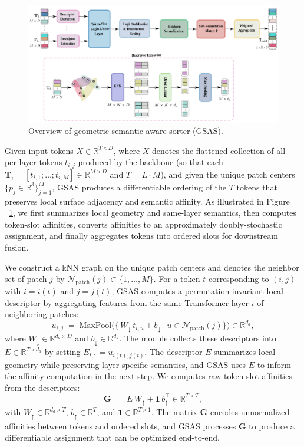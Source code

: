 \begin{figure}[h!]
  \centering 
    \includegraphics[width=0.98\linewidth]{figs/GSAS}
  \caption{Overview of geometric semantic-aware sorter (GSAS).}
  \label{fig:GSAS}
\end{figure}

Given input tokens \(X\in\mathbb{R}^{T\times D}\), where \(X\) denotes the flattened collection of all per-layer tokens \(t_{i,j}\) produced by the backbone (so that each \(\mathbf{T}_i=[t_{i,1};\dots;t_{i,M}]\in\mathbb{R}^{M\times D}\) and \(T=L\cdot M\)), and given the unique patch centers \(\{p_j\in\mathbb{R}^3\}_{j=1}^M\), GSAS produces a differentiable ordering of the \(T\) tokens that preserves local surface adjacency and semantic affinity. As illustrated in Figure ~\ref{fig:GSAS}, we first summarizes local geometry and same-layer semantics, then computes token-slot affinities, converts affinities to an approximately doubly-stochastic assignment, and finally aggregates tokens into ordered slots for downstream fusion.

We construct a kNN graph on the unique patch centers and denotes the neighbor set of patch \(j\) by \(\mathcal{N}_{\mathrm{patch}}(j)\subset\{1,\dots,M\}\). For a token \(t\) corresponding to \((i,j)\) with \(i=i(t)\) and \(j=j(t)\), GSAS computes a permutation-invariant local descriptor by aggregating features from the same Transformer layer \(i\) of neighboring patches:
\begin{equation}
u_{i,j} \;=\; \mathrm{MaxPool}\Big(\big\{\,W_{\downarrow}\,t_{i,u} + b_{\downarrow} \ \big|\ u\in\mathcal{N}_{\mathrm{patch}}(j)\big\}\Big)\in\mathbb{R}^{d_a},
\end{equation}
where \(W_{\downarrow}\in\mathbb{R}^{d_a\times D}\) and \(b_{\downarrow}\in\mathbb{R}^{d_a}\). The module collects these descriptors into \(E\in\mathbb{R}^{T\times d_a}\) by setting \(E_{t,:}=u_{i(t),j(t)}\). The descriptor \(E\) summarizes local geometry while preserving layer-specific semantics, and GSAS uses \(E\) to inform the affinity computation in the next step. We computes raw token-slot affinities from the descriptors:
\begin{equation}
\mathbf{G} \;=\; E\,W_{\uparrow} + \mathbf{1}\,b_{\uparrow}^\top \in\mathbb{R}^{T\times T},
\end{equation}
with \(W_{\uparrow}\in\mathbb{R}^{d_a\times T}\), \(b_{\uparrow}\in\mathbb{R}^T\), and \(\mathbf{1}\in\mathbb{R}^{T\times 1}\). The matrix \(\mathbf{G}\) encodes unnormalized affinities between tokens and ordered slots, and GSAS processes \(\mathbf{G}\) to produce a differentiable assignment that can be optimized end-to-end.

